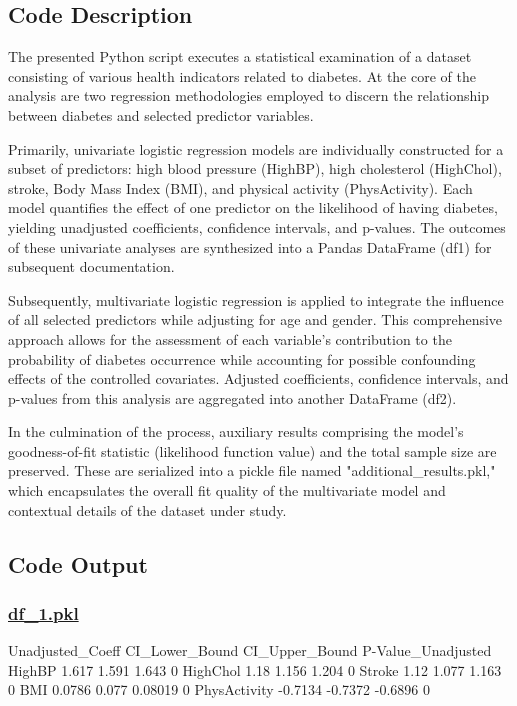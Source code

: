 \documentclass[11pt]{article}
\begin{document}
\subsection{Code Description}

The presented Python script executes a statistical examination of a dataset consisting of various health indicators related to diabetes. At the core of the analysis are two regression methodologies employed to discern the relationship between diabetes and selected predictor variables.

Primarily, univariate logistic regression models are individually constructed for a subset of predictors: high blood pressure (HighBP), high cholesterol (HighChol), stroke, Body Mass Index (BMI), and physical activity (PhysActivity). Each model quantifies the effect of one predictor on the likelihood of having diabetes, yielding unadjusted coefficients, confidence intervals, and p-values. The outcomes of these univariate analyses are synthesized into a Pandas DataFrame (df1) for subsequent documentation.

Subsequently, multivariate logistic regression is applied to integrate the influence of all selected predictors while adjusting for age and gender. This comprehensive approach allows for the assessment of each variable's contribution to the probability of diabetes occurrence while accounting for possible confounding effects of the controlled covariates. Adjusted coefficients, confidence intervals, and p-values from this analysis are aggregated into another DataFrame (df2).

In the culmination of the process, auxiliary results comprising the model's goodness-of-fit statistic (likelihood function value) and the total sample size are preserved. These are serialized into a pickle file named "additional\_results.pkl," which encapsulates the overall fit quality of the multivariate model and contextual details of the dataset under study.

\subsection{Code Output}\hypertarget{file-df-1-pkl}{}

\subsubsection*{\hyperlink{code-Data Analysis-df-1-pkl}{df\_1.pkl}}

\begin{codeoutput}
             Unadjusted\_Coeff CI\_Lower\_Bound CI\_Upper\_Bound P-Value\_Unadjusted
HighBP                  1.617          1.591          1.643                  0
HighChol                 1.18          1.156          1.204                  0
Stroke                   1.12          1.077          1.163                  0
BMI                    0.0786          0.077        0.08019                  0
PhysActivity          -0.7134        -0.7372        -0.6896                  0
\end{codeoutput}\hypertarget{file-df-2-pkl}{}
\end{document}
